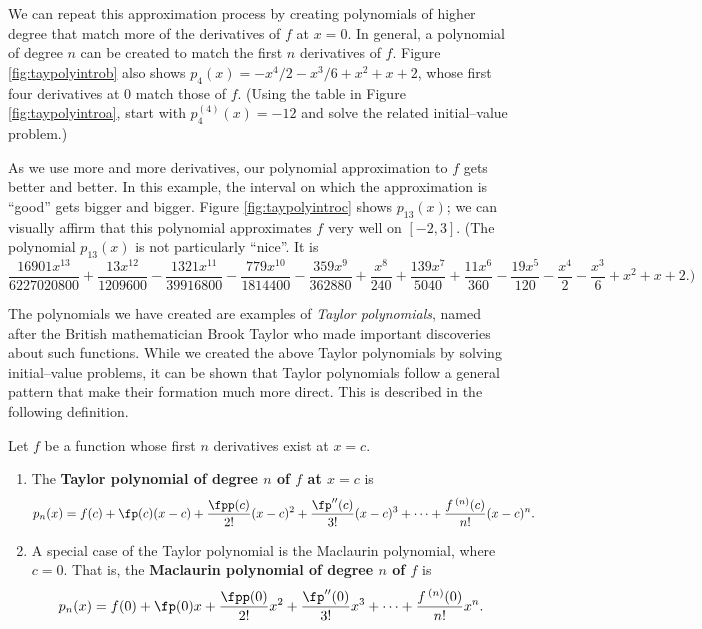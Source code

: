 
We can repeat this approximation process by creating polynomials of higher degree that match more of the derivatives of $f$ at $x=0$. In general, a polynomial of degree $n$ can be created to match the first $n$ derivatives of $f$. Figure \ref{fig:taypolyintrob} also shows $p_4(x)= -x^4/2-x^3/6+x^2+x+2$, whose first four derivatives at 0 match those of $f$. (Using the table in Figure \ref{fig:taypolyintroa}, start with $p_4^{(4)}(x)=-12$ and solve the related initial--value problem.)

As we use more and more derivatives, our polynomial approximation to $f$ gets better and better. In this example, the interval on which the approximation is ``good'' gets bigger and bigger. Figure \ref{fig:taypolyintroc} shows $p_{13}(x)$; we can visually affirm that this polynomial approximates $f$ very well on $[-2,3]$. (The polynomial $p_{13}(x)$ is not particularly ``nice''. It is {\scriptsize $$ \frac{16901x^{13}}{6227020800}+\frac{13x^{12}}{1209600}-\frac{1321x^{11}}{39916800}-\frac{779x^{10}}{1814400}-\frac{359x^9}{362880}+\frac{x^8}{240}+\frac{139x^7}{5040}+\frac{11 x^6}{360}-\frac{19x^5}{120}-\frac{x^4}{2}-\frac{x^3}{6}+x^2+x+2\text{.)}$$}

The polynomials we have created are examples of \emph{Taylor polynomials}, named after the British mathematician Brook Taylor who made important discoveries about such functions. While we created the above Taylor polynomials by solving initial--value problems, it can be shown that Taylor polynomials follow a general pattern that make their formation much more direct. This is described in the following definition.

\setboxwidth{50pt}
{Let $f$ be a function whose first $n$ derivatives exist at $x=c$.
 
\begin{enumerate}
\item		The \textbf{Taylor polynomial of degree $n$ of $f$ at $x=c$} is 
				{$$p_n(x) = f(c) + \fp(c)(x-c) + \frac{\fpp(c)}{2!}(x-c)^2+\frac{\fp''(c)}{3!}(x-c)^3+\cdots+\frac{f\,^{(n)}(c)}{n!}(x-c)^n.$$}

\item		A special case of the Taylor polynomial is the Maclaurin polynomial, where $c=0$. That is, the \textbf{Maclaurin polynomial of degree $n$ of $f$} is 
{$$p_n(x) = f(0) + \fp(0)x + \frac{\fpp(0)}{2!}x^2+\frac{\fp''(0)}{3!}x^3+\cdots+\frac{f\,^{(n)}(0)}{n!}x^n.$$}
\end{enumerate}}

